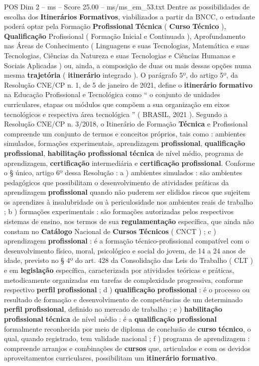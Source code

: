 \begin{textsample}{POS Dim 2 – ms – Score 25.00 – ms/ms\_em\_53.txt}
Dentre as possibilidades de escolha dos \textbf{Itinerários} \textbf{Formativos}, viabilizados a partir da BNCC, o estudante poderá optar pela Formação \textbf{Profissional} \textbf{Técnica} ( \textbf{Curso} \textbf{Técnico} ), \textbf{Qualificação} Profissional ( Formação Inicial e Continuada ), Aprofundamento nas Áreas de Conhecimento ( Linguagens e suas Tecnologias, Matemática e suas Tecnologias, Ciências da Natureza e suas Tecnologias e Ciências Humanas e Sociais Aplicadas ) ou, ainda, a composição de duas ou mais dessas opções numa mesma \textbf{trajetória} ( \textbf{itinerário} integrado ).
O parágrafo 5º, do artigo 5º, da Resolução CNE/CP n. 1, de 5 de janeiro de 2021, define o \textbf{itinerário} \textbf{formativo} na Educação Profissional e Tecnológica como “ o conjunto de unidades curriculares, etapas ou módulos que compõem a sua organização em eixos tecnológicos e respectiva área tecnológica ” ( BRASIL, 2021 ).
Segundo a Resolução CNE/CP n. 3/2018, o Itinerário de Formação \textbf{Técnica} e Profissional compreende um conjunto de termos e conceitos próprios, tais como : ambientes simulados, formações experimentais, aprendizagem \textbf{profissional}, \textbf{qualificação} \textbf{profissional}, \textbf{habilitação} \textbf{profissional} \textbf{técnica} de nível médio, programa de aprendizagem, \textbf{certificação} intermediária e \textbf{certificação} \textbf{profissional}.
Conforme o § único, artigo 6º dessa Resolução : a ) ambientes simulados : são ambientes pedagógicos que possibilitam o desenvolvimento de atividades práticas da aprendizagem \textbf{profissional} quando não puderem ser elididos riscos que sujeitem os aprendizes à insalubridade ou à periculosidade nos ambientes reais de trabalho ; b ) formações experimentais : são formações autorizadas pelos respectivos sistemas de ensino, nos termos de sua \textbf{regulamentação} específica, que ainda não constam no \textbf{Catálogo} Nacional de \textbf{Cursos} \textbf{Técnicos} ( CNCT ) ; c ) aprendizagem \textbf{profissional} : é a formação técnico-profissional compatível com o desenvolvimento físico, moral, psicológico e social do jovem, de 14 a 24 anos de idade, previsto no § 4º do art. 428 da Consolidação das Leis do Trabalho ( CLT ) e em \textbf{legislação} específica, caracterizada por atividades teóricas e práticas, metodicamente organizadas em tarefas de complexidade progressiva, conforme respectivo \textbf{perfil} \textbf{profissional} ; d ) \textbf{qualificação} \textbf{profissional} : é o processo ou resultado de formação e desenvolvimento de competências de um determinado \textbf{perfil} \textbf{profissional}, definido no mercado de trabalho ; e ) \textbf{habilitação} \textbf{profissional} \textbf{técnica} de nível médio : é a \textbf{qualificação} \textbf{profissional} formalmente reconhecida por meio de diploma de conclusão de \textbf{curso} \textbf{técnico}, o qual, quando registrado, tem validade nacional ; f ) programa de aprendizagem : compreende arranjos e combinações de \textbf{cursos} que, articulados e com os devidos aproveitamentos curriculares, possibilitam um \textbf{itinerário} \textbf{formativo}.

\end{textsample}
